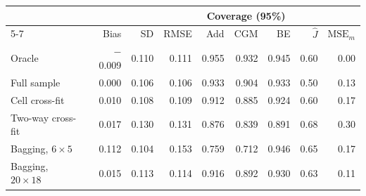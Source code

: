 \begin{tabular}{lrrrrrrrr}
\toprule
 & \multicolumn{3}{c}{} & \multicolumn{3}{c}{Coverage (95\%)} & \multicolumn{2}{c}{} \\ \cmidrule(lr){5-7}
 & Bias & SD & RMSE & Add & CGM & BE & $\widehat J$ & $\mathrm{MSE}_m$ \\
\midrule
Oracle & $-$0.009 & 0.110 & 0.111 & 0.955 & 0.932 & 0.945 & 0.60 & 0.00 \\
Full sample & 0.000 & 0.106 & 0.106 & 0.933 & 0.904 & 0.933 & 0.50 & 0.13 \\
Cell cross-fit & 0.010 & 0.108 & 0.109 & 0.912 & 0.885 & 0.924 & 0.60 & 0.17 \\
Two-way cross-fit & 0.017 & 0.130 & 0.131 & 0.876 & 0.839 & 0.891 & 0.68 & 0.30 \\
Bagging, $6\times5$ & 0.112 & 0.104 & 0.153 & 0.759 & 0.712 & 0.946 & 0.65 & 0.17 \\
Bagging, $20\times18$ & 0.015 & 0.113 & 0.114 & 0.916 & 0.892 & 0.930 & 0.63 & 0.11 \\
\bottomrule
\end{tabular}
